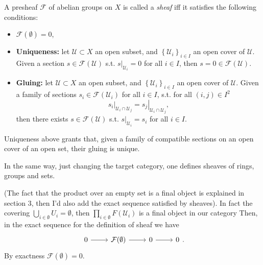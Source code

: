 \documentclass[../Main]{subfiles}
\begin{document}
\begin{defn}[Sheaf]
	A presheaf $\mathcal{F}$ of abelian groups on $X$ is called a {\em sheaf} iff
	it satisfies the following conditions:
	\begin{itemize}
		\item $\mathcal{F}(\emptyset) = 0$,
		\item \textbf{Uniqueness:} let $\mathcal{U} \subset X$ an open subset, and
			$\left\{ \mathcal{U}_i \right\}_{i \in I}$ an
			open cover of $\mathcal{U}$.
			Given a section $s \in \mathcal{F}(\mathcal{U})$ s.t.
			$\left.s\right|_{\mathcal{U}_i} = 0$ for all $i \in I$,
			then $s = 0 \in \mathcal{F}(\mathcal{U})$.
		\item \textbf{Gluing:} let $\mathcal{U} \subset X$ an open subset, and
			$\left\{ \mathcal{U}_i \right\}_{i \in I}$ an
			open cover of $\mathcal{U}$.
			Given a family of sections $s_i \in \mathcal{F}(\mathcal{U}_i)$
			for all $i \in I$, s.t. for all $\left(i, j\right) \in I^2$
			\begin{equation}
			\left.s_i\right|_{\mathcal{U}_i \cap \mathcal{U}_j} =
			\left.s_j\right|_{\mathcal{U}_i \cap \mathcal{U}_j} 
			,\end{equation} 
			then there exists $s \in \mathcal{F}(\mathcal{U})$ s.t.
			$\left.s\right|_{\mathcal{U}_i} = s_i$ for all $i \in I$.
	\end{itemize}
\end{defn}

\begin{rem}[]
	Uniqueness above grants that, given a family of compatible
	sections on an open cover of an open set, their gluing is unique.
\end{rem}

\begin{rem}[]
	In the same way, just changing the target category,
	one defines sheaves of rings, groups and sets.
\end{rem}

\begin{rem}
	(The fact that the product over an empty set is a final object is explained
	in section 3, then I'd also add the exact sequence satisfied by sheaves).
	In fact the covering $\bigcup_{i \in \emptyset} U_i = \emptyset$,
	then $\prod_{i \in \emptyset} F(\mathcal{U}_i)$ is a final object in our category
	Then, in the exact sequence for the definition of sheaf we have
	\begin{equation}
	\begin{tikzcd}
		0 \arrow[r, "", rightarrow] &
		\mathcal{F}(\emptyset) \arrow[r, "", rightarrow] &
		0 \arrow[r, "", rightarrow] &
		0
	\end{tikzcd}
	.\end{equation} 
	By exactness $\mathcal{F}(\emptyset) = 0$.
\end{rem}
\end{document}

